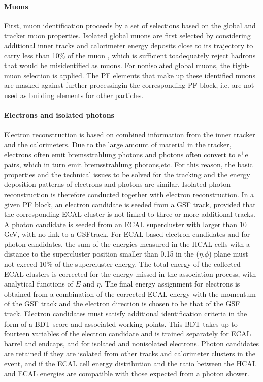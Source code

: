 \paragraph{Muons} First, muon identification proceeds by a set of selections based on the global and tracker muon properties. Isolated global muons are first selected by considering additional inner tracks and calorimeter energy deposits close to its trajectory to carry less than 10$\%$ of the muon \pt, which is sufficient toadequately reject hadrons that would be misidentified as muons. For nonisolated global muons, the tight-muon selection \cite{collaboration_2012} is applied. The PF elements that make up these identified muons are masked against further processingin the corresponding PF block, i.e. are not used as building elements for other particles.

\paragraph{Electrons and isolated photons} Electron reconstruction is based on combined information from the inner tracker and the calorimeters. Due to the large amount of material in the tracker, electrons often emit bremsstrahlung photons and photons often convert to e$^+$e$^-$ pairs, which in turn emit bremsstrahlung photons,etc.  For this reason, the basic properties and the technical issues to be solved for the tracking and the energy deposition patterns of electrons and photons are similar. Isolated photon reconstruction is therefore conducted together with electron reconstruction. In a given PF block, an electron candidate is seeded from a GSF track, provided that the corresponding ECAL cluster is not linked to three or more additional tracks. A photon candidate is seeded from an ECAL supercluster with \et larger than 10 GeV, with no link to a GSFtrack. For ECAL-based electron candidates and for photon candidates, the sum of the energies measured in the HCAL cells with a distance to the supercluster position smaller than 0.15 in the ($\eta$,$\phi$) plane must not exceed 10$\%$ of the supercluster energy. The total energy of the collected ECAL clusters is corrected for the energy missed in the association process, with analytical functions of $E$ and $\eta$. The final energy assignment for electrons is obtained from a combination of the corrected ECAL energy with the momentum of the GSF track and the electron direction is chosen to be that of the GSF track. Electron candidates must satisfy additional identification criteria in the form of a BDT score and associated working points. This BDT takes up to fourteen variables of the electron candidate and is trained separately for ECAL barrel and endcaps, and for isolated and nonisolated electrons. Photon candidates are retained if they are isolated from other tracks and calorimeter clusters in the event, and if the ECAL cell energy distribution and the ratio between the HCAL and ECAL energies are compatible with those expected from a photon shower. 

